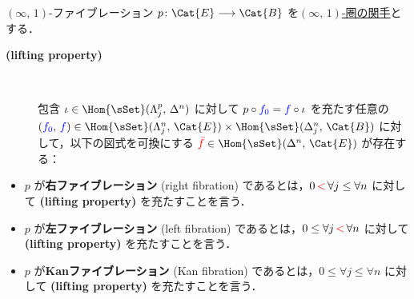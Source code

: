 \documentclass[TQFT_main]{subfiles}
\begin{document}
\begin{mydef}[label=def:infty-fib]{{$(\infty,\, 1)$}-ファイブレーション}
    $p \colon \Cat{E} \lto \Cat{B}$ を\hyperref[def:infty-1]{$(\infty,\, 1)$-圏の関手}とする．
    \begin{description}
        \item[\textbf{(lifting property)}]　
        
        包含 $\iota \in \Hom{\sSet}(\Lambda^p_j,\, \Delta^n)$ に対して $p \circ \textcolor{blue}{f_0} = \textcolor{blue}{f} \circ \iota$ を充たす任意の $(\textcolor{blue}{f_0},\, \textcolor{blue}{f}) \in \Hom{\sSet}(\Lambda^n_j,\, \Cat{E}) \times \Hom{\sSet}(\Delta^n_j,\, \Cat{B})$ に対して，以下の図式を可換にする $\textcolor{red}{\bar{f}} \in \Hom{\sSet}(\Delta^n,\, \Cat{E})$ が存在する：
        \begin{center}
        \end{center}
    \end{description}
    \tcblower
    \begin{itemize}
        \item $p$ が\textbf{右ファイブレーション} (right fibration) であるとは，$0 \,\textcolor{red}{<}\, \forall j \le \forall n$ に対して \textsf{\textbf{(lifting property)}} を充たすことを言う．
        \item $p$ が\textbf{左ファイブレーション} (left fibration) であるとは，$0 \le \forall j \,\textcolor{red}{<}\, \forall n$ に対して \textsf{\textbf{(lifting property)}} を充たすことを言う．
        \item $p$ が\textbf{Kanファイブレーション} (Kan fibration) であるとは，$0 \le \forall j \le \forall n$ に対して \textsf{\textbf{(lifting property)}} を充たすことを言う．
    \end{itemize}
\end{mydef}
\end{document}
